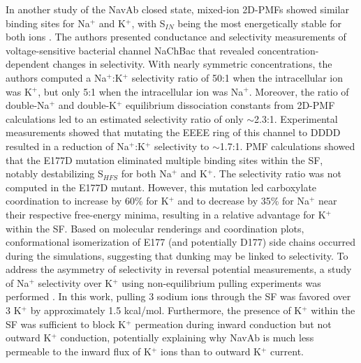 \begin{refsection}
In another study of the NavAb closed state, mixed-ion 2D-PMFs showed similar binding sites for Na$^{+}$ and K$^{+}$, with S$_{IN}$ being the most energetically stable for both ions \cite{FinolUrdaneta:2014bz}.  The authors presented conductance and selectivity measurements of voltage-sensitive bacterial channel NaChBac that revealed concentration-dependent changes in selectivity.  With nearly symmetric concentrations, the authors computed a Na$^{+}$:K$^{+}$ selectivity ratio of 50:1 when the intracellular ion was K$^{+}$, but only 5:1 when the intracellular ion was Na$^{+}$.  Moreover, the ratio of double-Na$^{+}$ and double-K$^{+}$ equilibrium dissociation constants from 2D-PMF calculations led to an estimated selectivity ratio of only $\sim$2.3:1.  Experimental measurements showed that mutating the EEEE ring of this channel to DDDD resulted in a reduction of Na$^{+}$:K$^{+}$ selectivity to $\sim$1.7:1.  PMF calculations showed that the E177D mutation eliminated multiple binding sites within the SF, notably destabilizing S$_{HFS}$ for both Na$^{+}$ and K$^{+}$.  The selectivity ratio was not computed in the E177D mutant.  However, this mutation led carboxylate coordination to increase by 60\% for K$^{+}$ and to decrease by 35\% for Na$^{+}$ near their respective free-energy minima, resulting in a relative advantage for K$^{+}$ within the SF.  Based on molecular renderings and coordination plots, conformational isomerization of E177 (and potentially D177) side chains occurred during the simulations, suggesting that dunking may be linked to selectivity.  To address the asymmetry of selectivity in reversal potential measurements, a study of Na$^{+}$ selectivity over K$^{+}$ using non-equilibrium pulling experiments was performed \cite{Ngo:2016es}.  In this work, pulling 3 sodium ions through the SF was favored over 3 K$^{+}$ by approximately 1.5 kcal/mol.  Furthermore, the presence of K$^{+}$ within the SF was sufficient to block K$^{+}$ permeation during inward conduction but not outward K$^{+}$ conduction, potentially explaining why NavAb is much less permeable to the inward flux of K$^{+}$ ions than to outward K$^{+}$ current.
 

\end{refsection}
